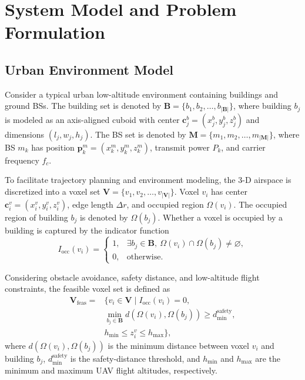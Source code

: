 \documentclass[lettersize,journal]{IEEEtran}
\begin{document}
\section{System Model and Problem Formulation}

\subsection{Urban Environment Model}

Consider a typical urban low-altitude environment containing buildings and ground BSs. The building set is denoted by $\mathbf{B}=\{b_1,b_2,\ldots,b_{|\mathbf{B}|}\}$, where building $b_j$ is modeled as an axis-aligned cuboid with center $\mathbf{c}_j^b=(x_j^b,y_j^b,z_j^b)$ and dimensions $(l_j,w_j,h_j)$. The BS set is denoted by $\mathbf{M}=\{m_1,m_2,\ldots,m_{|\mathbf{M}|}\}$, where BS $m_k$ has position $\mathbf{p}_k^m=(x_k^m,y_k^m,z_k^m)$, transmit power $P_k$, and carrier frequency $f_c$.

To facilitate trajectory planning and environment modeling, the 3-D airspace is discretized into a voxel set $\mathbf{V}=\{v_1,v_2,\ldots,v_{|\mathbf{V}|}\}$. Voxel $v_i$ has center $\mathbf{c}_i^v=(x_i^v,y_i^v,z_i^v)$, edge length $\Delta r$, and occupied region $\Omega(v_i)$. The occupied region of building $b_j$ is denoted by $\Omega(b_j)$. Whether a voxel is occupied by a building is captured by the indicator function
\begin{equation}
I_{\mathrm{occ}}(v_i)=
\begin{cases}
1, & \exists b_j\in\mathbf{B},\ \Omega(v_i)\cap\Omega(b_j)\neq\varnothing,\\
0, & \mathrm{otherwise}.
\end{cases}
\end{equation}

Considering obstacle avoidance, safety distance, and low-altitude flight constraints, the feasible voxel set is defined as
\begin{equation}
\begin{aligned}
\mathbf{V}_{\mathrm{feas}}=&\{v_i\in\mathbf{V}\mid I_{\mathrm{occ}}(v_i)=0,\\
&\min_{b_j\in\mathbf{B}}d(\Omega(v_i),\Omega(b_j))\ge d_{\min}^{\mathrm{safety}},\\
& h_{\min}\le z_i^v\le h_{\max}\},
\end{aligned}
\end{equation}
where $d(\Omega(v_i),\Omega(b_j))$ is the minimum distance between voxel $v_i$ and building $b_j$, $d_{\min}^{\mathrm{safety}}$ is the safety-distance threshold, and $h_{\min}$ and $h_{\max}$ are the minimum and maximum UAV flight altitudes, respectively.
\end{document}
